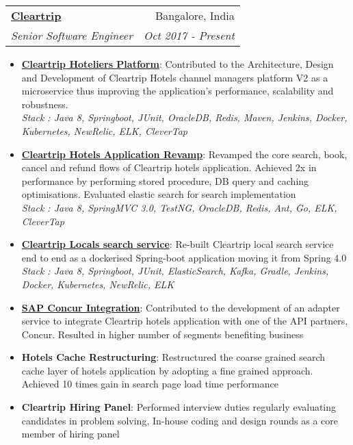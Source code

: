 \documentclass[letterpaper,11pt]{article}
\makeatletter
\newcommand{\resumeItem}[2]{
  \item\small{
    \textbf{#1}{: #2 \vspace{-2pt}}
  }
}
\newcommand{\resumeSubheading}[4]{
  \vspace{-1pt}\item
    \begin{tabular*}{0.97\textwidth}{l@{\extracolsep{\fill}}r}
      \textbf{#1} & #2 \\
      \textit{\small#3} & \textit{\small #4} \\
    \end{tabular*}\vspace{-5pt}
}
\newcommand{\resumeItemListStart}{\begin{itemize}}
\newcommand{\resumeItemListEnd}{\end{itemize}\vspace{-5pt}}
\makeatother
\begin{document}
    \resumeSubheading
      {\href{www.cleartrip.com}{Cleartrip}}{Bangalore, India}
      {Senior Software Engineer}{Oct 2017 - Present}
      \resumeItemListStart
          \resumeItem{\href{https://suite.cleartrip.com/login}{Cleartrip Hoteliers Platform}}
          {Contributed to the Architecture, Design and Development of Cleartrip Hotels channel managers platform V2 as a microservice thus improving the application's performance, scalability and robustness. \mbox{}\\
          \textit{Stack : Java 8, Springboot, JUnit, OracleDB, Redis, Maven, Jenkins, Docker, Kubernetes, NewRelic, ELK, CleverTap}}
          \resumeItem{\href{https://www.cleartrip.com/hotels}{Cleartrip Hotels Application Revamp}}
          {Revamped the core search, book, cancel and refund flows of Cleartrip hotels application. Achieved 2x in performance by performing stored procedure, DB query and caching optimisations. Evaluated elastic search for search implementation  \mbox{}\\ \textit{Stack : Java 8, SpringMVC 3.0, TestNG, OracleDB, Redis, Ant, Go, ELK, CleverTap}}
          \resumeItem{\href{https://www.cleartrip.com/local}{Cleartrip Locals search service}}
          {Re-built Cleartrip local search service end to end as a dockerised Spring-boot application moving it from Spring 4.0 \mbox{}\\ \textit{Stack : Java 8, Springboot, JUnit, ElasticSearch, Kafka, Gradle, Jenkins, Docker, Kubernetes, NewRelic, ELK}}
          \resumeItem{\href{https://www.concur.co.in/travel-management}{SAP Concur Integration}}
          {Contributed to the development of an adapter service to integrate Cleartrip hotels application with one of the API partners, Concur. Resulted in higher number of segments benefiting business}
          \resumeItem{Hotels Cache Restructuring}
          {Restructured the coarse grained search cache layer of hotels application by adopting a fine grained approach. Achieved 10 times gain in search page load time performance}
          \resumeItem{Cleartrip Hiring Panel}
          {Performed interview duties regularly evaluating candidates in problem solving, In-house coding and design rounds as a core member of hiring panel}
      \resumeItemListEnd
      
\end{document}

